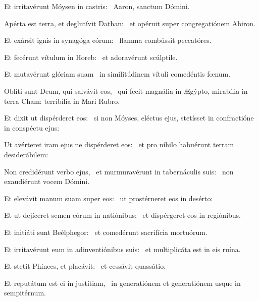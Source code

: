 
\item Et irritavérunt Móysen in castris:~\psstar{} Aaron, sanctum Dómini.

\item Apérta est terra, et deglutívit Dathan:~\psstar{} et opéruit super congregatiónem Abiron.

\item Et exársit ignis in synagóga eórum:~\psstar{} flamma combússit peccatóres.

\item Et fecérunt vítulum in Horeb:~\psstar{} et adoravérunt scúlptile.

\item Et mutavérunt glóriam suam~\psstar{} in similitúdinem vítuli comedéntis fœnum.

\item Oblíti sunt Deum, qui salvávit eos,~\psstar{} qui fecit magnália in Ægýpto, mirabília in terra Cham: terribília in Mari Rubro.

\item Et dixit ut dispérderet eos:~\psstar{} si non Móyses, eléctus ejus, stetísset in confractióne in conspéctu ejus:

\item Ut avérteret iram ejus ne dispérderet eos:~\psstar{} et pro níhilo habuérunt terram desiderábilem:

\item Non credidérunt verbo ejus,~\pscross{} et murmuravérunt in tabernáculis suis:~\psstar{} non exaudiérunt vocem Dómini.

\item Et elevávit manum suam super eos:~\psstar{} ut prostérneret eos in desérto:

\item Et ut dejíceret semen eórum in natiónibus:~\psstar{} et dispérgeret eos in regiónibus.

\item Et initiáti sunt Beélphegor:~\psstar{} et comedérunt sacrifícia mortuórum.

\item Et irritavérunt eum in adinventiónibus suis:~\psstar{} et multiplicáta est in eis ruína.

\item Et stetit Phínees, et placávit:~\psstar{} et cessávit quassátio.

\item Et reputátum est ei in justítiam,~\psstar{} in generatiónem et generatiónem usque in sempitérnum.

